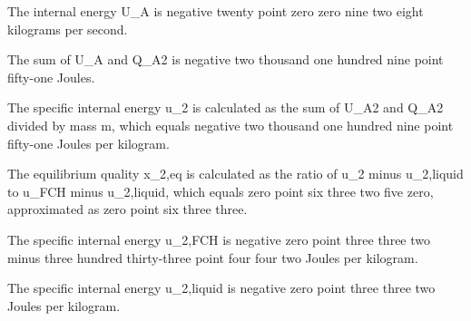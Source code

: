 The internal energy U_A is negative twenty point zero zero nine two eight kilograms per second.

The sum of U_A and Q_A2 is negative two thousand one hundred nine point fifty-one Joules.

The specific internal energy u_2 is calculated as the sum of U_A2 and Q_A2 divided by mass m, which equals negative two thousand one hundred nine point fifty-one Joules per kilogram.

The equilibrium quality x_2,eq is calculated as the ratio of u_2 minus u_2,liquid to u_FCH minus u_2,liquid, which equals zero point six three two five zero, approximated as zero point six three three.

The specific internal energy u_2,FCH is negative zero point three three two minus three hundred thirty-three point four four two Joules per kilogram.

The specific internal energy u_2,liquid is negative zero point three three two Joules per kilogram.